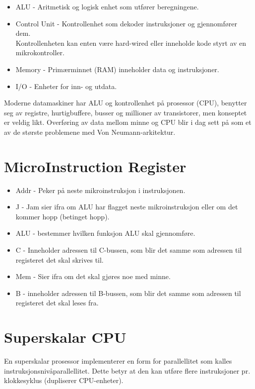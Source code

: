 \documentclass[a4paper, 10pt]{article}
\begin{document}
\begin{itemize}
	\item ALU - Aritmetisk og logisk enhet som utfører beregningene.
	\item Control Unit - Kontrollenhet som dekoder instruksjoner og gjennomfører dem. \\ Kontrollenheten kan enten være hard-wired eller inneholde kode styrt av en mikrokontroller.
	\item Memory - Primærminnet (RAM) inneholder data og instruksjoner.
	\item I/O - Enheter for inn- og utdata.
	
\end{itemize}

Moderne datamaskiner har ALU og kontrollenhet på prosessor (CPU), benytter seg av registre, hurtigbuffere, busser og millioner av transistorer, men konseptet er veldig likt. Overføring av data mellom minne og CPU blir i dag sett på som et av de største problemene med Von Neumann-arkitektur.

\section{MicroInstruction Register}
\begin{itemize}
	\item Addr - Peker på neste mikroinstruksjon i instruksjonen.
	\item J - Jam sier ifra om ALU har flagget neste mikroinstruksjon eller om det kommer hopp (betinget hopp).
	\item ALU - bestemmer hvilken funksjon ALU skal gjennomføre.
	\item C - Inneholder adressen til C-bussen, som blir det samme som adressen til registeret det skal skrives til. 
	\item Mem - Sier ifra om det skal gjøres noe med minne.
	\item B - inneholder adressen til B-bussen, som blir det samme som adressen til registeret det skal leses fra.
\end{itemize}

\section{Superskalar CPU}
En superskalar prosessor implementerer en form for parallellitet som kalles instruksjonsnivåparallellitet. Dette betyr at den kan utføre flere instruksjoner pr. klokkesyklus (dupliserer CPU-enheter).
\end{document}
